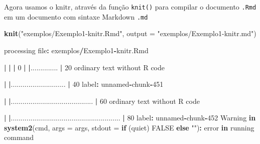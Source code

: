 \documentclass[10pt,a4paper]{book}
\newenvironment{Shaded}{\begin{snugshade}}{\end{snugshade}}
\newcommand{\KeywordTok}[1]{\textcolor[rgb]{0.13,0.29,0.53}{\textbf{#1}}}
\newcommand{\DataTypeTok}[1]{\textcolor[rgb]{0.13,0.29,0.53}{#1}}
\newcommand{\DecValTok}[1]{\textcolor[rgb]{0.00,0.00,0.81}{#1}}
\newcommand{\StringTok}[1]{\textcolor[rgb]{0.31,0.60,0.02}{#1}}
\newcommand{\OtherTok}[1]{\textcolor[rgb]{0.56,0.35,0.01}{#1}}
\newcommand{\ControlFlowTok}[1]{\textcolor[rgb]{0.13,0.29,0.53}{\textbf{#1}}}
\newcommand{\OperatorTok}[1]{\textcolor[rgb]{0.81,0.36,0.00}{\textbf{#1}}}
\newcommand{\ErrorTok}[1]{\textcolor[rgb]{0.64,0.00,0.00}{\textbf{#1}}}
\newcommand{\NormalTok}[1]{#1}
\begin{document}
Agora usamos o knitr, através da função \texttt{knit()} para compilar o
documento \texttt{.Rmd} em um documento com sintaxe Markdown
\texttt{.md}

\begin{Shaded}
\begin{Highlighting}[]
\KeywordTok{knit}\NormalTok{(}\StringTok{"exemplos/Exemplo1-knitr.Rmd"}\NormalTok{, }\DataTypeTok{output =} \StringTok{"exemplos/Exemplo1-knitr.md"}\NormalTok{)}


\NormalTok{processing file}\OperatorTok{:}\StringTok{ }\NormalTok{exemplos}\OperatorTok{/}\NormalTok{Exemplo1}\OperatorTok{-}\NormalTok{knitr.Rmd}

  \OperatorTok{|}\StringTok{                                                                            }
\StringTok{  }\ErrorTok{|}\StringTok{                                                                      }\ErrorTok{|}\StringTok{   }\DecValTok{0}\NormalTok{%
  \OperatorTok{|}\StringTok{                                                                            }
\StringTok{  }\ErrorTok{|}\NormalTok{..............                                                        }\OperatorTok{|}\StringTok{  }\DecValTok{20}\NormalTok{%
\NormalTok{  ordinary text without R code}


  \OperatorTok{|}\StringTok{                                                                            }
\StringTok{  }\ErrorTok{|}\NormalTok{............................                                          }\OperatorTok{|}\StringTok{  }\DecValTok{40}\NormalTok{%
\NormalTok{label}\OperatorTok{:}\StringTok{ }\NormalTok{unnamed}\OperatorTok{-}\NormalTok{chunk}\OperatorTok{-}\DecValTok{451}

  \OperatorTok{|}\StringTok{                                                                            }
\StringTok{  }\ErrorTok{|}\NormalTok{..........................................                            }\OperatorTok{|}\StringTok{  }\DecValTok{60}\NormalTok{%
\NormalTok{  ordinary text without R code}


  \OperatorTok{|}\StringTok{                                                                            }
\StringTok{  }\ErrorTok{|}\NormalTok{........................................................              }\OperatorTok{|}\StringTok{  }\DecValTok{80}\NormalTok{%
\NormalTok{label}\OperatorTok{:}\StringTok{ }\NormalTok{unnamed}\OperatorTok{-}\NormalTok{chunk}\OperatorTok{-}\DecValTok{452}
\NormalTok{Warning }\ControlFlowTok{in} \KeywordTok{system2}\NormalTok{(cmd, }\DataTypeTok{args =}\NormalTok{ args, }\DataTypeTok{stdout =} \ControlFlowTok{if}\NormalTok{ (quiet) }\OtherTok{FALSE} \ControlFlowTok{else} \StringTok{""}\NormalTok{)}\OperatorTok{:}\StringTok{ }\NormalTok{error}
\ControlFlowTok{in}\NormalTok{ running command}

}}}}}
\end{Highlighting}
\end{Shaded}
\end{document}
